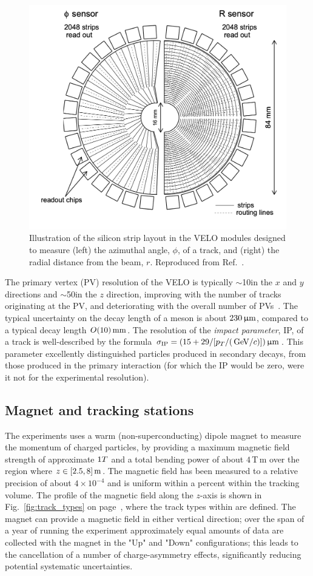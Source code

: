 \begin{figure}[tb]
    \centering
    \includegraphics[width=0.55\columnwidth]{figures/detector/VELO_sensors.png}
    \caption{Illustration of the silicon strip layout in the VELO modules designed to measure (left) the azimuthal angle, $\phi$, of a track, and (right) the radial distance from the beam, $r$. Reproduced from Ref.~\cite{VELO-TDR}.}
    \label{fig:VELO_sensors}
\end{figure}

The primary vertex (PV) resolution of the VELO is typically $\sim $10\mum in the $x$ and $y$ directions and $\sim$50\mum in the $z$ direction, improving with the number of tracks originating at the PV, and deteriorating with the overall number of PVs~\cite{VELO-Performance}. The typical uncertainty on the decay length of a \B meson is about $230\,\upmu\text{m}$, compared to a typical decay length$~O(10)\text{\,mm}$. The resolution of the \emph{impact parameter}, IP, of a track is well-described by the formula $\sigma_\mathrm{IP}=(15+29/[p_T/(\text{\,Ge\kern -0.1em V}/c)])\,\upmu\text{m}$. This parameter excellently distinguished particles produced in secondary decays, from those produced in the primary interaction (for which the IP would be zero, were it not for the experimental resolution).

\subsection{Magnet and tracking stations} %
\label{sub:magnet_and_tracking_stations}

The \lhcb experiments uses a warm (non-superconducting) dipole magnet to measure the momentum of charged particles, by providing a maximum magnetic field strength of approximate $1{T}$ and a total bending power of about $4\,$T\,m over the region where $z\in[2.5, 8]\text{\,m}$. The magnetic field has been measured to a relative precision of about $4\times 10^{-4}$ and is uniform within a percent within the tracking volume. The profile of the magnetic field along the $z$-axis is shown in Fig.~\ref{fig:track_types} on page~\pageref{fig:track_types}, where the track types within \lhcb are defined. The magnet can provide a magnetic field in either vertical direction; over the span of a year of running the experiment approximately equal amounts of data are collected with the magnet in the "Up" and "Down" configurations; this leads to the cancellation of a number of charge-asymmetry effects, significantly reducing potential systematic uncertainties. 

